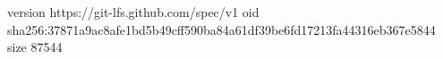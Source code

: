 version https://git-lfs.github.com/spec/v1
oid sha256:37871a9ac8afe1bd5b49cff590ba84a61df39be6fd17213fa44316eb367e5844
size 87544

